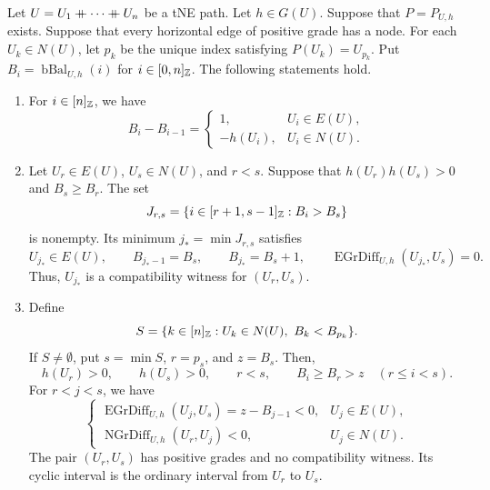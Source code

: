 \begin{lemma}\label{lem:explicit-compatibility-witness}
Let $U=U_1\mathbin{+\mkern-10mu+}\cdots\mathbin{+\mkern-10mu+} U_n$ be a tNE path. Let $h\in G(U)$. Suppose that
$P=P_{U,h}$ exists. Suppose that every horizontal edge of positive grade has a node.
For each $U_k\in N(U)$, let $p_k$ be the unique index satisfying $P(U_k)=U_{p_k}$.
Put $B_i=\operatorname{bBal}_{U,h}(i)$ for $i\in[0,n]_{\mathbb Z}$.
The following statements hold.
\begin{enumerate}
\item\label{c:explicit-balance-increments} For $i\in[n]_{\mathbb Z}$, we have
\[
 B_i-B_{i-1}=\begin{cases}1,&U_i\in E(U),\\-h(U_i),&U_i\in N(U).
 \end{cases}
\]
\item\label{c:explicit-positive-witness} Let $U_r\in E(U)$, $U_s\in N(U)$, and $r<s$.
Suppose that $h(U_r)h(U_s)>0$ and $B_s\ge B_r$.
The set
\[
 J_{r,s}=\{i\in[r+1,s-1]_{\mathbb Z}:B_i>B_s\}
\]
is nonempty. Its minimum $j_* =\min J_{r,s}$ satisfies
\[
 U_{j_*}\in E(U),\qquad B_{j_*-1}=B_s,\qquad B_{j_*}=B_s+1,
 \qquad \operatorname{EGrDiff}_{U,h}(U_{j_*},U_s)=0.
\]
Thus, $U_{j_*}$ is a compatibility witness for $(U_r,U_s)$.
\item\label{c:explicit-failing-pair} Define
\[
 S=\{k\in[n]_{\Z}:U_k\in N(U),\ B_k<B_{p_k}\}.
\]
If $S\ne\emptyset$, put $s=\min S$, $r=p_s$, and $z=B_s$.
Then,
\[
 h(U_r)>0,\qquad h(U_s)>0,\qquad r<s,\qquad
 B_i\ge B_r>z\quad(r\le i<s).
\]
For $r<j<s$, we have
\[
 \begin{cases}
 \operatorname{EGrDiff}_{U,h}(U_j,U_s)=z-B_{j-1}<0,&U_j\in E(U),\\
 \operatorname{NGrDiff}_{U,h}(U_r,U_j)<0,&U_j\in N(U).
 \end{cases}
\]
The pair $(U_r,U_s)$ has positive grades and no compatibility witness.
Its cyclic interval is the ordinary interval from $U_r$ to $U_s$.
\end{enumerate}
\end{lemma}
